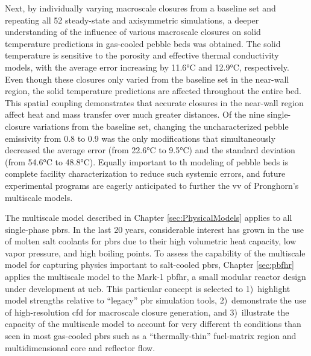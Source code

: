 Next, by individually varying macroscale closures from a baseline set and repeating all 52 steady-state and axisymmetric simulations, a deeper understanding of the influence of various macroscale closures on solid temperature predictions in gas-cooled pebble beds was obtained. The solid temperature is sensitive to the porosity and effective thermal conductivity models, with the average error increasing by 11.6\si{\celsius} and 12.9\si{\celsius}, respectively. Even though these closures only varied from the baseline set in the near-wall region, the solid temperature predictions are affected throughout the entire bed. This spatial coupling demonstrates that accurate closures in the near-wall region affect heat and mass transfer over much greater distances. Of the nine single-closure variations from the baseline set, changing the uncharacterized pebble emissivity from 0.8 to 0.9 was the only modifications that simultaneously decreased the average error (from 22.6\si{\celsius} to 9.5\si{\celsius}) and the standard deviation (from 54.6\si{\celsius} to 48.8\si{\celsius}). Equally important to \gls{th} modeling of pebble beds is complete facility characterization to reduce such systemic errors, and future experimental programs are eagerly anticipated to further the \gls{vv} of Pronghorn's multiscale models.

The multiscale model described in Chapter \ref{sec:PhysicalModels} applies to all single-phase \glspl{pbr}. In the last 20 years, considerable interest has grown in the use of molten salt coolants for \glspl{pbr} due to their high volumetric heat capacity, low vapor pressure, and high boiling points. To assess the capability of the multiscale model for capturing physics important to salt-cooled \glspl{pbr}, Chapter \ref{sec:pbfhr} applies the multiscale model to the Mark-1 \gls{pbfhr}, a small modular reactor design under development at \gls{ucb}. This particular concept is selected to 1)~highlight model strengths relative to ``legacy'' \gls{pbr} simulation tools, 2)~demonstrate the use of high-resolution \gls{cfd} for macroscale closure generation, and 3)~illustrate the capacity of the multiscale model to account for very different \gls{th} conditions than seen in most gas-cooled \glspl{pbr} such as a ``thermally-thin'' fuel-matrix region and multidimensional core and reflector flow.

